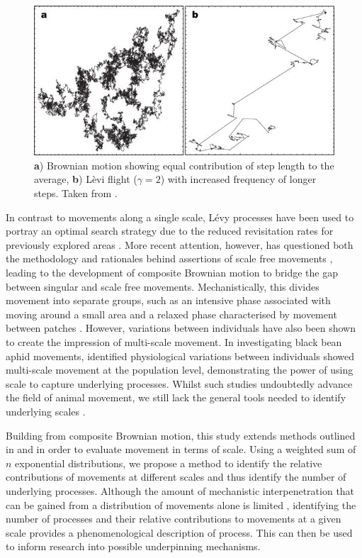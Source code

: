 \documentclass[11pt,usenames,dvipsnames,a4paper]{article}
\begin{document}
\begin{linenumbers}
\begin{figure}[H]
	\centering
	\includegraphics[scale=0.7]{LeviFlight.jpg}
	\caption{\textbf{a}) Brownian motion showing equal contribution of step length to the average, \textbf{b}) L\`evi flight ($\gamma = 2$) with increased frequency of longer steps. Taken from \cite{Barthelemy2008}.}
\end{figure}

In contrast to movements along a single scale, L\'evy processes have been used to portray an optimal search strategy due to the reduced revisitation rates for previously explored areas \citep{Viswanathan1999, Humphries2014}. More recent attention, however, has questioned both the methodology and rationales behind assertions of scale free movements \citep{DeJager2013, Jansen2012, Kolzsch2015, Wosniack2017}, leading to the development of composite Brownian motion to bridge the gap between singular and scale free movements. Mechanistically, this divides movement into separate groups, such as an intensive phase associated with moving around a small area and a relaxed phase characterised by movement between patches \citep{Auger-Methe2015}. However, variations between individuals have also been shown to create the impression of multi-scale movement. In investigating  black bean aphid movements, \cite{Petrovskii2011} identified physiological variations between individuals showed multi-scale movement at the population level, demonstrating the power of using scale to capture underlying processes. Whilst such studies undoubtedly advance the field of animal movement, we still lack the general tools needed to identify underlying scales \citep{Nathan2008, Patterson2017}.

Building from composite Brownian motion, this study extends methods outlined in \cite{Petrovskii2011} and \cite{Jansen2012} in order to evaluate movement in terms of scale. Using a weighted sum of $n$ exponential distributions, we propose a method to identify the relative contributions of movements at different scales and thus identify the number of underlying processes. Although the amount of mechanistic interpenetration that can be gained from a distribution of movements alone is limited \citep{Bearup2016}, identifying the number of processes and their relative contributions to movements at a given scale provides a phenomenological description of process. This can then be used to inform research into possible underpinning mechanisms. 


\end{linenumbers}
\end{document}
